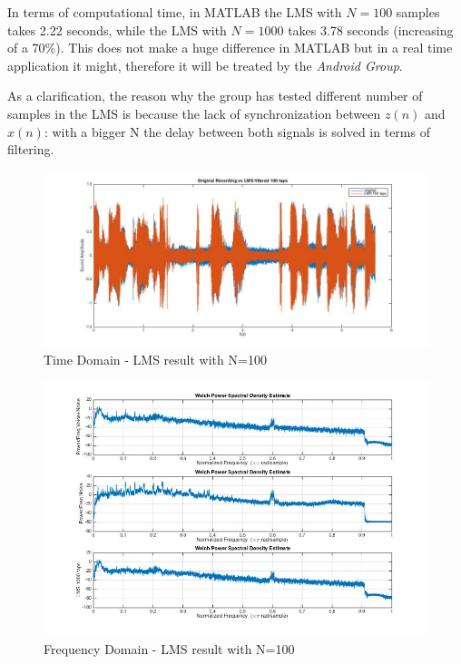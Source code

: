 \documentclass[11pt,a4paper,spanish]{book}  %
\theoremstyle{definition}  %
\theoremstyle{plain}  %
\theoremstyle{remark}  %
\begin{document}
	In terms of computational time, in MATLAB the LMS with $N=100$ samples takes 2.22 seconds, while the LMS with $N=1000$ takes 3.78 seconds (increasing of a 70\%). This does not make a huge difference in MATLAB but in a real time application it might, therefore it will be treated by the \textit{Android Group}.
	

	As a clarification, the reason why the group has tested different number of samples in the LMS is because the lack of synchronization between $z(n)$ and $x(n)$: with a bigger N the delay between both signals is solved in terms of filtering.
	
		\begin{figure}[h]
		\centering
		\includegraphics[width=15cm]{images/theory/lms100tapstime.jpg}
		\caption{Time Domain - LMS result with N=100}
		\label{fig:lmstime100}
		\end{figure}
		
		
		\begin{figure}[h]
		\centering
		\includegraphics[width=15cm]{images/theory/lms100tapsfreq.jpg}
		\caption{Frequency Domain - LMS result with N=100}
		\label{fig:lmsfreq100}
		\end{figure}
		
\end{document}

